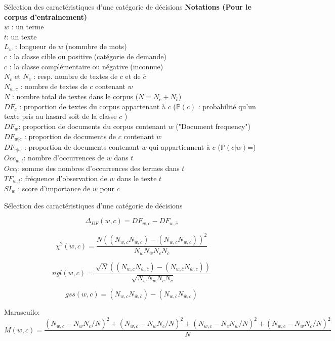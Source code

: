\documentclass[newPxFont,pagenumber]{beamer}
\newcommand{\p}{\mathbb{P}}
\begin{document}
\begin{frame}{Sélection des caractéristiques d'une catégorie de décisions}
\label{notations}
\scriptsize 
\textbf{Notations (Pour le corpus d'entrainement)} \\
$w$ : un terme \\
$t$: un texte \\
$L_w$ : longueur de $w$ (nommbre de mots) \\
$c$ : la classe cible ou positive (catégorie de demande)\\
$\overline{c}$ : la classe complémentaire ou négative (inconnue) \\
$N_{c}$ et $N_{\overline{c}}$ : resp. nombre de textes de $c$ et de $\overline{c}$\\
$N_{w,c}$ : nombre de textes de $c$ contenant $w$ \\
$N$ : nombre total de textes dans le corpus ($N = N_{c} + N_{\overline{c}}$)\\
$DF_c$ : proportion de textes du corpus appartenant à $c$ ($\p(c)$ : probabilité qu'un texte pris au hasard soit de la classe $c$ )\\
$DF_w$: proportion de documents du corpus contenant $w$ ("Document frequency")\\
$DF_{w \vert c}$ : proportion de documents de $c$ contenant $w$ \\
$DF_{c \vert w}$ : proportion de documents contenant $w$ qui appartiennent à $c$ ($\p(c \vert w)$=)\\
$Occ_{w,t}$: nombre d'occurrences de $w$ dans $t$ \\
$Occ_t$: somme des nombres d'occurrences des termes dans $t$ \\
$TF_{w,t}$: fréquence d'observation de $w$ dans le texte $t$ \\
$SI_{w}$ : score d'importance de $w$ pour $c$

\end{frame}

\begin{frame}{Sélection des caractéristiques d'une catégorie de décisions}
\label{featuresSelectors}
\scriptsize 

\[\Delta_{DF}(w,c) = DF_{w,c} - DF_{w,\overline{c}}\]

\[\chi^2(w,c) = \frac{N ((N_{w,c} N_{\overline{w},\overline{c}}) - (N_{w,\overline{c}} N_{\overline{w},c}))^2}{N_w N_{\overline{w}} N_c N_{\overline{c}}}\]

\[ngl(w,c) = \frac{\sqrt{N} ((N_{w,c} N_{\overline{w},\overline{c}}) - (N_{w,\overline{c}} N_{\overline{w},c}))}{\sqrt{N_w N_{\overline{w}} N_c N_{\overline{c}}}}\]

\[gss(w,c) = (N_{w,c} N_{\overline{w},\overline{c}}) -  (N_{w,\overline{c}} N_{\overline{w},c})\]


Marascuilo:
\[M(w,c) = \frac{(N_{w,c} - N_{w}N_c/N)^2 + (N_{w,\overline{c}} - N_{w}N_{\overline{c}}/N)^2 + (N_{\overline{w},c} - N_{c}N_{\overline{w}}/N)^2 + (N_{\overline{w},\overline{c}} - N_{\overline{w}}N_{\overline{c}}/N)^2 }{N}\]

\end{frame}
\end{document}
